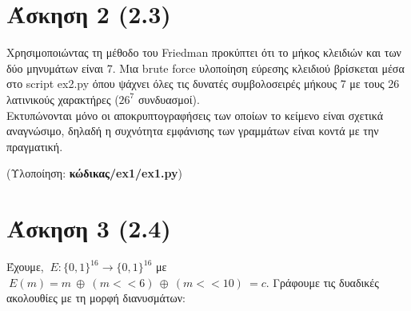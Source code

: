 \documentclass[12pt]{article}
\newcommand{\lt}{\latintext}
\newcommand{\xor}{\ensuremath{\oplus}}
\begin{document}
\pagebreak

\section*{Άσκηση 2 (2.3)}

Χρησιμοποιώντας τη μέθοδο του {\lt Friedman} προκύπτει ότι το μήκος κλειδιών και των δύο μηνυμάτων είναι 7. Μια {\lt brute force} υλοποίηση εύρεσης κλειδιού βρίσκεται μέσα στο {\lt script ex2.py} όπου ψάχνει όλες τις δυνατές συμβολοσειρές μήκους 7 με τους 26 λατινικούς χαρακτήρες ($26^7$ συνδυασμοί). \\

\noindent
Εκτυπώνονται μόνο οι αποκρυπτογραφήσεις των οποίων το κείμενο είναι σχετικά αναγνώσιμο, δηλαδή η συχνότητα εμφάνισης των γραμμάτων είναι κοντά με την πραγματική.

\vspace{0.3in}

\noindent
(Υλοποίηση: \textbf{κώδικας/{\lt ex1/ex1.py}})

\pagebreak

\section*{Άσκηση 3 (2.4)}

Έχουμε, $\:E: \{0, 1\}^{16} \rightarrow \{0, 1\}^{16}$ με 
$\:E(m) = m\:\xor\:(m << 6)\:\xor\:(m << 10)\: = c$. Γράφουμε τις δυαδικές ακολουθίες με τη μορφή διανυσμάτων:
\end{document}
